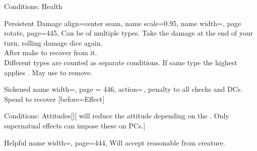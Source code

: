 \begin{PageFront}
\begin{Tables}{\frontTableHeight}
\begin{Table}{Conditions: Health}
            \begin{entry}{Persistent Damage}{%
                align=center seam,
                name scale=0.95,
                name width=\conditionLength,%
                page rotate,
                page=445,
            }
                Can be of multiple types. Take the damage at the end of your turn, rolling damage dice again.\hfill
                \\
                After make \Flat[][val=15] to recover from it. \hfill
                \\
                Different types are counted as separate conditions.
                If same type the highest applies . \hfill
                May use  to remove.
            \end{entry}
            \begin{entry}{Sickened}{%
                name width=\conditionLength,%
                page = 446,
                action=\,\X,
            }
                \Numb{-\X} \Status penalty to all checks and DCs. Spend  to recover
                [before=Effect]
                \hfill {}
            \end{entry}
        \end{Table}
        \TableSpace
        \begin{Table}{Conditions: Attitudes}[][ will reduce the attitude depending on the \GM.
        \quad Only supernatual effects can impose these on PCs.]
            \begin{entry}{Helpful}{%
                name width=\conditionLength,%
                page=444,
            }
                Will accept reasonable  from creature. \hfill

\end{entry}
\end{Table}
\end{Tables}
\end{PageFront}
